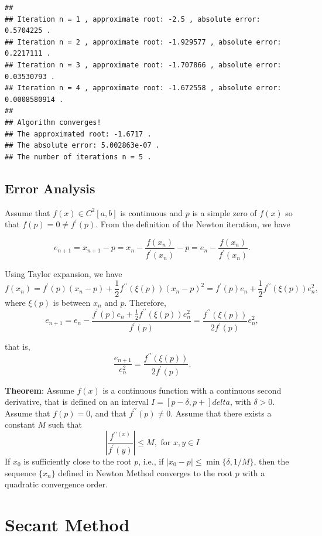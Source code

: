 \documentclass[
]{book}
\begin{document}
\begin{verbatim}
## 
## Iteration n = 1 , approximate root: -2.5 , absolute error: 0.5704225 .
## Iteration n = 2 , approximate root: -1.929577 , absolute error: 0.2217111 .
## Iteration n = 3 , approximate root: -1.707866 , absolute error: 0.03530793 .
## Iteration n = 4 , approximate root: -1.672558 , absolute error: 0.0008580914 .
## 
## Algorithm converges!
## The approximated root: -1.6717 .
## The absolute error: 5.002863e-07 .
## The number of iterations n = 5 .
\end{verbatim}

\hfill\break

\hypertarget{error-analysis-3}{%
\section{Error Analysis}\label{error-analysis-3}}

Assume that \(f(x) \in C^2[a,b]\) is continuous and \(p\) is a simple zero of \(f(x)\) so that \(f(p) = 0 \ne f^\prime(p)\). From the definition of the Newton iteration, we have

\[
e_{n+1} = x_{n+1} - p = x_n -\frac{f(x_n)}{f^\prime(x_n)} - p = e_n - \frac{f(x_n)}{f^\prime(x_n)}.
\]

Using Taylor expansion, we have
\[
f(x_n) = f^\prime(p)(x_n - p) + \frac{1}{2}f^{\prime\prime}(\xi(p))(x_n-p)^2 = f^\prime(p)e_n + \frac{1}{2}f^{\prime\prime}(\xi(p))e_n^2,
\]
where \(\xi(p)\) is between \(x_n\) and \(p\). Therefore,
\[
e_{n+1} = e_n - \frac{f^\prime(p)e_n + \frac{1}{2}f^{\prime\prime}(\xi(p))e_n^2}{f^\prime(p)} = \frac{f^{\prime\prime}(\xi(p))}{2f^\prime(p)}e_n^2,
\]

that is,
\[
\frac{e_{n+1}}{e_n^2} = \frac{f^{\prime\prime}(\xi(p))}{2f^\prime(p)}.
\]

\textbf{Theorem}: Assume \(f(x)\) is a continuous function with a continuous second derivative, that is defined on an interval \(I = [p - \delta, p + ]delta\), with \(\delta > 0\). Assume that \(f(p) = 0\), and that \(f^{\prime\prime}(p) \ne 0\). Assume that there exists a constant \(M\) such that
\[
\left|\frac{f^{\prime\prime(x)}}{f^\prime(y)} \right| \le M, \text{ for } x, y \in I
\]
If \(x_0\) is sufficiently close to the root \(p\), i.e., if \(|x_0 - p| \le \min\{\delta, 1/M\}\), then the sequence \(\{x_n\}\) defined in Newton Method converges to the root \(p\) with a quadratic convergence order.

\hypertarget{secant-method}{%
\chapter{Secant Method}\label{secant-method}}
\end{document}

